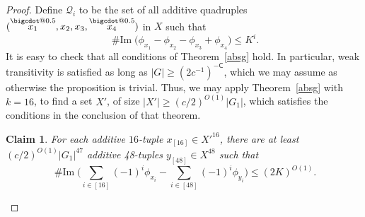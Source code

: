 \documentclass[a4paper,11pt]{article}
\makeatletter
\numberwithin{theorem}{section}
\newtheorem{claim}[theorem]{Claim}
\theoremstyle{definition}
\newcommand{\on}[1]{
	\operatorname{#1}
}
\newcommand\range{\on{\# Im}}
\newcommand*\bcdot{\mathpalette\bigcdot@{0.5}}
\newcommand*\bigcdot@[2]{\mathbin{\vcenter{\hbox{\scalebox{#2}{$\m@th#1\bullet$}}}}}
\newcommand{\blc}{\bm{\mathsf{C}}}
\newcommand{\upd}[1]{\overset{\bcdot}{#1}}
\makeatother
\begin{document}
\begin{proof}
    Define $\mathcal{Q}_i$ to be the set of all additive quadruples $(\upd{x_1}, x_2, x_3, \upd{x_4})$ in $X$ such that 
    \[\range\Big(\phi_{x_1} - \phi_{x_2} - \phi_{x_3} + \phi_{x_4}\Big) \leq K^i.\]
    It is easy to check that all conditions of Theorem~\ref{absg} hold. In particular, weak transitivity is satisfied as long as $|G| \geq (2c^{-1})^{-\blc}$, which we may assume as otherwise the proposition is trivial. Thus, we may apply  Theorem~\ref{absg} with $k = 16$, to find a set $X'$, of size $|X'| \geq (c/2)^{O(1)} |G_1|$, which satisfies the conditions in the conclusion of that theorem.

    \begin{claim}
        For each additive $16$-tuple $x_{[16]} \in {X'}^{16}$, there are at least $(c/2)^{O(1)} |G_1|^{47}$ additive 48-tuples $y_{[48]} \in X^{48}$ such that 
        \[\range\Big(\sum_{i \in [16]} (-1)^i \phi_{x_i} - \sum_{i \in [48]} (-1)^i \phi_{y_i}\Big) \leq (2K)^{O(1)}.\]
    \end{claim}


\end{proof}
\end{document}
